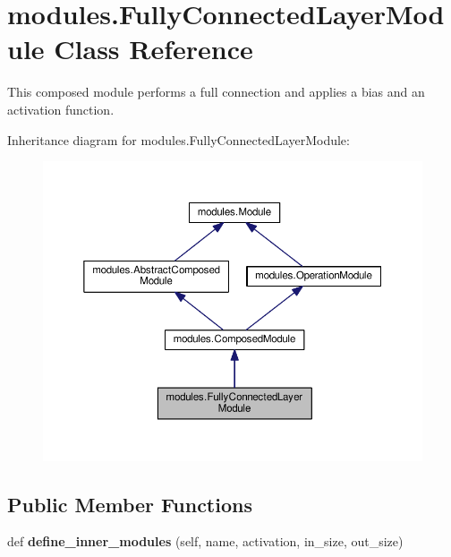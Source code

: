 \hypertarget{classmodules_1_1_fully_connected_layer_module}{}\section{modules.\+Fully\+Connected\+Layer\+Module Class Reference}
\label{classmodules_1_1_fully_connected_layer_module}


This composed module performs a full connection and applies a bias and an activation function.  




Inheritance diagram for modules.\+Fully\+Connected\+Layer\+Module\+:\nopagebreak
\begin{figure}[H]
\begin{center}
\leavevmode
\includegraphics[width=350pt]{classmodules_1_1_fully_connected_layer_module__inherit__graph}
\end{center}
\end{figure}
\subsection*{Public Member Functions}
\begin{DoxyCompactItemize}
\item 
\mbox{\label{classmodules_1_1_fully_connected_layer_module_ab2470e07b8f4dd9d8fd924c1f1df0cc3}} 
def {\bfseries define\+\_\+inner\+\_\+modules} (self, name, activation, in\+\_\+size, out\+\_\+size)
\end{DoxyCompactItemize}
